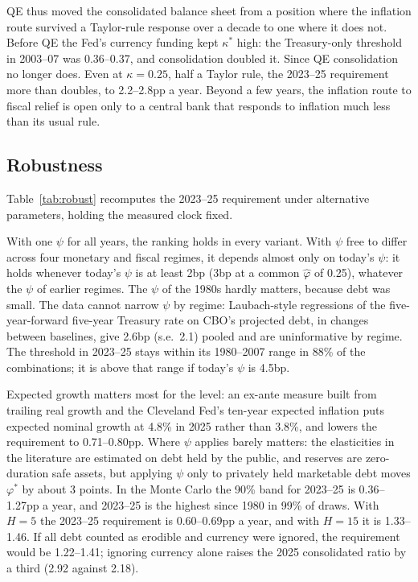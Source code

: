 QE thus moved the consolidated balance sheet from a position where the inflation route survived a Taylor-rule response over a decade to one where it does not. Before QE the Fed's currency funding kept $\kappa^*$ high: the Treasury-only threshold in 2003--07 was 0.36--0.37, and consolidation doubled it. Since QE consolidation no longer does. Even at $\kappa=0.25$, half a Taylor rule, the 2023--25 requirement more than doubles, to 2.2--2.8pp a year. Beyond a few years, the inflation route to fiscal relief is open only to a central bank that responds to inflation much less than its usual rule.

\subsection{Robustness}\label{sec:robust}

Table~\ref{tab:robust} recomputes the 2023--25 requirement under alternative parameters, holding the measured clock fixed.



With one $\psi$ for all years, the ranking holds in every variant. With $\psi$ free to differ across four monetary and fiscal regimes, it depends almost only on today's $\psi$: it holds whenever today's $\psi$ is at least 2bp (3bp at a common $\hat\varphi$ of 0.25), whatever the $\psi$ of earlier regimes. The $\psi$ of the 1980s hardly matters, because debt was small. The data cannot narrow $\psi$ by regime: Laubach-style regressions of the five-year-forward five-year Treasury rate on CBO's projected debt, in changes between baselines, give 2.6bp (s.e.\ 2.1) pooled and are uninformative by regime. The threshold in 2023--25 stays within its 1980--2007 range in 88\% of the combinations; it is above that range if today's $\psi$ is 4.5bp.

Expected growth matters most for the level: an ex-ante measure built from trailing real growth and the Cleveland Fed's ten-year expected inflation puts expected nominal growth at 4.8\% in 2025 rather than 3.8\%, and lowers the requirement to 0.71--0.80pp. Where $\psi$ applies barely matters: the elasticities in the literature are estimated on debt held by the public, and reserves are zero-duration safe assets, but applying $\psi$ only to privately held marketable debt moves $\varphi^*$ by about 3 points. In the Monte Carlo the 90\% band for 2023--25 is 0.36--1.27pp a year, and 2023--25 is the highest since 1980 in 99\% of draws. With $H=5$ the 2023--25 requirement is 0.60--0.69pp a year, and with $H=15$ it is 1.33--1.46. If all debt counted as erodible and currency were ignored, the requirement would be 1.22--1.41; ignoring currency alone raises the 2025 consolidated ratio by a third (2.92 against 2.18).

